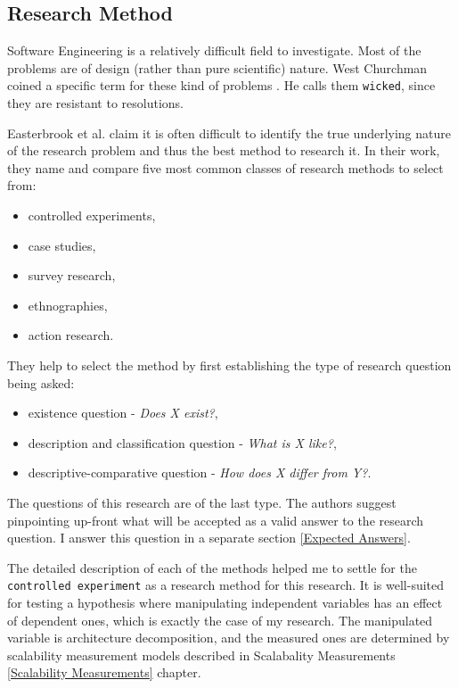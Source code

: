 \documentclass{uvamscse}
\begin{document}
\subsection{Research Method}\label{Research Method}
Software Engineering is a relatively difficult field to investigate. Most of the problems are of design (rather than pure scientific) nature. West Churchman coined a specific term for these kind of problems \cite{Wckd}. He calls them \texttt{wicked}, since they are resistant to resolutions.

Easterbrook et al. \cite{EastBr} claim it is often difficult to identify the true underlying nature of the research problem and thus the best method to research it. In their work, they name and compare five most common classes of research methods to select from:
\begin{itemize}
  \item controlled experiments,
  \item case studies,
  \item survey research,
  \item ethnographies,
  \item action research.
\end{itemize}
They help to select the method by first establishing the type of research question being asked:
\begin{itemize}
  \item existence question - \textit{Does X exist?},
  \item description and classification question - \textit{What is X like?},
  \item descriptive-comparative question - \textit{How does X differ from Y?}.
\end{itemize}
The questions of this research are of the last type. The authors \cite{EastBr} suggest pinpointing up-front what will be accepted as a valid answer to the research question. I answer this question in a separate section \ref{Expected Answers}.

The detailed description of each of the methods helped me to settle for the \texttt{controlled experiment} as a research method for this research. It is well-suited for testing a hypothesis where manipulating independent variables has an effect of dependent ones, which is exactly the case of my research. The manipulated variable is architecture decomposition, and the measured ones are determined by scalability measurement models described in Scalabality Measurements \ref{Scalability Measurements} chapter.
\end{document}
